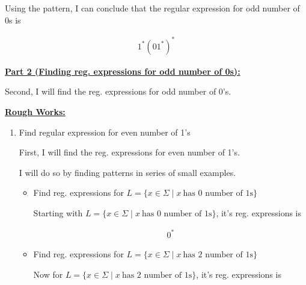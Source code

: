 \documentclass[12pt]{article}
\begin{document}
\begin{enumerate}[a.]
    \bigskip

    Using the pattern, I can conclude that the regular expression for
    odd number of 0s is

    \begin{align}
        1^*(01^*)^*
    \end{align}


    \underline{\textbf{Part 2 (Finding reg. expressions for odd number of 0s):}}

    \bigskip

    Second, I will find the reg. expressions for odd number of 0's.

    \bigskip



    \underline{\textbf{Rough Works:}}

    \bigskip

    \begin{enumerate}[1.]
        \item Find regular expression for even number of 1's

        \bigskip

        First, I will find the reg. expressions for even number of 1's.

        \bigskip

        I will do so by finding patterns in series of small examples.

        \bigskip

        \begin{itemize}
            \item Find reg. expressions for $L = \{x \in \Sigma \mid x\:\text{has 0 number of 1s}\}$

            \bigskip

            Starting with $L = \{x \in \Sigma \mid x\:\text{has 0 number of 1s}\}$,
            it's reg. expressions is

            \begin{mdframed}
            \begin{align}
                0^*
            \end{align}
            \end{mdframed}

            \item Find reg. expressions for $L = \{x \in \Sigma \mid x\:\text{has 2 number of 1s}\}$

            \bigskip

            Now for $L = \{x \in \Sigma \mid x\:\text{has 2 number of 1s}\}$,
            it's reg. expressions is


\end{itemize}
\end{enumerate}
\end{enumerate}
\end{document}
